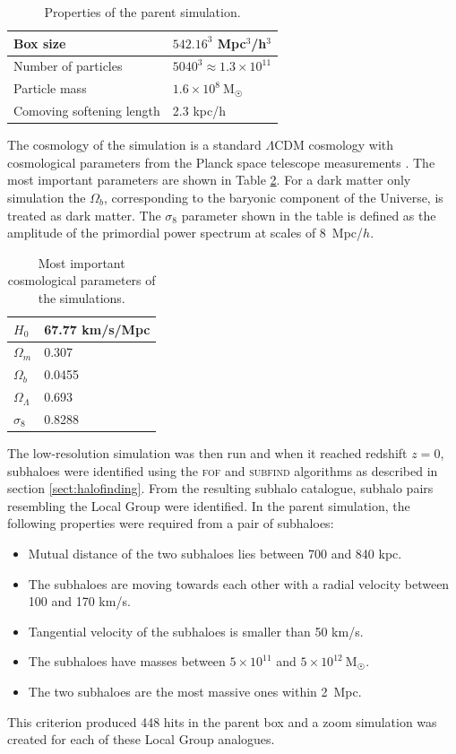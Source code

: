 \documentclass[english, twoside]{HYgradu}
\begin{document}
\begin{table}
	\centering
	\begin{tabular}{| l | l |}
		\hline
		Box size & $542.16^3$ Mpc$^3$/h$^3$ \\ \hline
		Number of particles & $5040^3 \approx 1.3 \times 10^{11}$ \\ \hline
		Particle mass & $1.6 \times 10^8~\mathrm{M_{\astrosun}}$ \\ \hline
		Comoving softening length & 2.3 kpc/h \\ \hline
	\end{tabular}
	\caption{Properties of the parent simulation.} \label{tab:parentBox}
\end{table}

The cosmology of the simulation is a standard $\Lambda$CDM cosmology with cosmological parameters from the Planck space telescope measurements \citep{planck2014resultsXVI}. The most important parameters are shown in Table \ref{tab:cosmopars}. For a dark matter only simulation the $\Omega_b$, corresponding to the baryonic component of the Universe, is treated as dark matter. The $\sigma_8$ parameter shown in the table is defined as the amplitude of the primordial power spectrum at scales of 8~Mpc/$h$.

\begin{table}
	\centering
	\begin{tabular}{| l | l |}
		\hline
		$H_0$ & 67.77 km/s/Mpc\\ \hline
		$\Omega_m$ & 0.307 \\ \hline
		$\Omega_b$ & 0.0455 \\ \hline
		$\Omega_\Lambda$ & 0.693 \\ \hline
		$\sigma_8$ & 0.8288 \\ \hline
	\end{tabular}
	\caption{Most important cosmological parameters of the simulations.} \label{tab:cosmopars}
\end{table}

The low-resolution simulation was then run and when it reached redshift $z=0$, subhaloes were identified using the \textsc{fof} and \textsc{subfind} algorithms as described in section \ref{sect:halofinding}. From the resulting subhalo catalogue, subhalo pairs resembling the Local Group were identified. In the parent simulation, the following properties were required from a pair of subhaloes:
\begin{itemize}
\item Mutual distance of the two subhaloes lies between 700 and 840 kpc.
\item The subhaloes are moving towards each other with a radial velocity between 100 and 170 km/s.
\item Tangential velocity of the subhaloes is smaller than 50 km/s.
\item The subhaloes have masses between $5 \times 10^{11}$ and $5 \times 10^{12}~\mathrm{M}_{\astrosun}$.
\item The two subhaloes are the most massive ones within 2~Mpc.
\end{itemize}
This criterion produced 448 hits in the parent box and a zoom simulation was created for each of these Local Group analogues.
\end{document}
